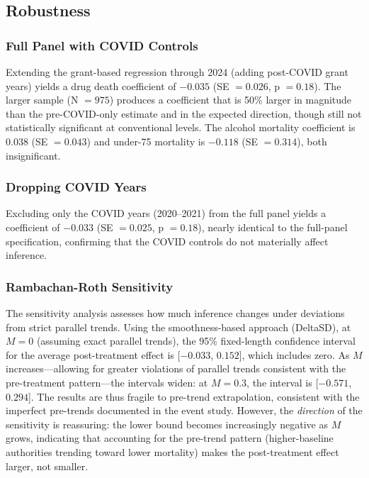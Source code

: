 \documentclass[12pt]{article}
\begin{document}
\subsection{Robustness}

\subsubsection{Full Panel with COVID Controls}

Extending the grant-based regression through 2024 (adding post-COVID grant years) yields a drug death coefficient of $-0.035$ (SE $= 0.026$, p $= 0.18$). The larger sample (N $= 975$) produces a coefficient that is 50\% larger in magnitude than the pre-COVID-only estimate and in the expected direction, though still not statistically significant at conventional levels. The alcohol mortality coefficient is 0.038 (SE $= 0.043$) and under-75 mortality is $-0.118$ (SE $= 0.314$), both insignificant.

\subsubsection{Dropping COVID Years}

Excluding only the COVID years (2020--2021) from the full panel yields a coefficient of $-0.033$ (SE $= 0.025$, p $= 0.18$), nearly identical to the full-panel specification, confirming that the COVID controls do not materially affect inference.

\subsubsection{Rambachan-Roth Sensitivity}

The \citet{rambachan2023} sensitivity analysis assesses how much inference changes under deviations from strict parallel trends. Using the smoothness-based approach (DeltaSD), at $M = 0$ (assuming exact parallel trends), the 95\% fixed-length confidence interval for the average post-treatment effect is [$-0.033$, $0.152$], which includes zero. As $M$ increases---allowing for greater violations of parallel trends consistent with the pre-treatment pattern---the intervals widen: at $M = 0.3$, the interval is [$-0.571$, $0.294$]. The results are thus fragile to pre-trend extrapolation, consistent with the imperfect pre-trends documented in the event study. However, the \textit{direction} of the sensitivity is reassuring: the lower bound becomes increasingly negative as $M$ grows, indicating that accounting for the pre-trend pattern (higher-baseline authorities trending toward lower mortality) makes the post-treatment effect larger, not smaller.
\end{document}
